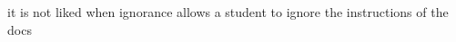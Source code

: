 \documentclass{article}
\begin{document}
it is not liked when ignorance allows a student to ignore the instructions of the docs\cite{greenwade93} 

 
\end{document}
